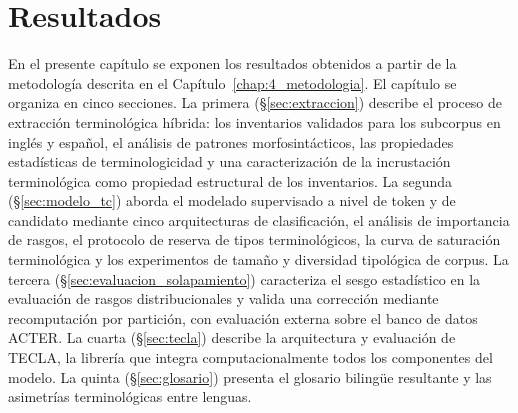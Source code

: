 
\renewcommand{\tablename}{Tabla}
\fontsize{14}{16}\selectfont

\chapter{Resultados}
\label{chap:5_resultados}

\makeatletter
\@afterindentfalse\@afterheading
\makeatother

\setcounter{section}{0}
\renewcommand{\thesection}{\thechapter.\arabic{section}}

\fontsize{12}{14}\selectfont
\vspace{\baselineskip}

{}

En el presente capítulo se exponen los resultados obtenidos a partir de la metodología descrita en el Capítulo~\ref{chap:4_metodologia}. El capítulo se organiza en cinco secciones. La primera (§\ref{sec:extraccion}) describe el proceso de extracción terminológica híbrida: los inventarios validados para los subcorpus en inglés y español, el análisis de patrones morfosintácticos, las propiedades estadísticas de terminologicidad y una caracterización de la incrustación terminológica como propiedad estructural de los inventarios. La segunda (§\ref{sec:modelo_tc}) aborda el modelado supervisado a nivel de token y de candidato mediante cinco arquitecturas de clasificación, el análisis de importancia de rasgos, el protocolo de reserva de tipos terminológicos, la curva de saturación terminológica y los experimentos de tamaño y diversidad tipológica de corpus. La tercera (§\ref{sec:evaluacion_solapamiento}) caracteriza el sesgo estadístico en la evaluación de rasgos distribucionales y valida una corrección mediante recomputación por partición, con evaluación externa sobre el banco de datos ACTER. La cuarta (§\ref{sec:tecla}) describe la arquitectura y evaluación de TECLA, la librería que integra computacionalmente todos los componentes del modelo. La quinta (§\ref{sec:glosario}) presenta el glosario bilingüe resultante y las asimetrías terminológicas entre lenguas.


